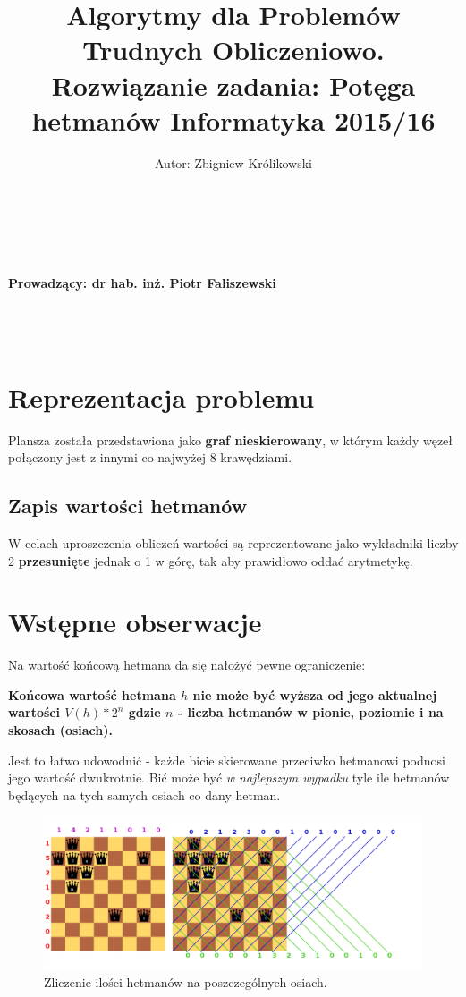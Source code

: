 \documentclass{article}
\author{Autor: Zbigniew Królikowski
\\\\\\\\}
\title{ Algorytmy dla Problemów Trudnych Obliczeniowo.\\
Rozwiązanie zadania: \textbf{Potęga hetmanów}
Informatyka 2015/16}
\begin{document}
\maketitle


\vfill

\paragraph{Prowadzący: dr hab. inż. Piotr Faliszewski
\\\\\\\\
}

\newpage

\tableofcontents

\newpage

\section{Reprezentacja problemu}

Plansza została przedstawiona jako \textbf{graf nieskierowany}, w którym każdy węzeł połączony jest z innymi co najwyżej 8 krawędziami.

\subsection{Zapis wartości hetmanów}

W celach uproszczenia obliczeń wartości są reprezentowane jako wykładniki liczby 2 \textbf{przesunięte} jednak o 1 w górę, tak aby prawidłowo oddać arytmetykę.

\section{Wstępne obserwacje}

Na wartość końcową hetmana da się nałożyć pewne ograniczenie:

\textbf{Końcowa wartość hetmana $h$ nie może być wyższa od jego aktualnej wartości $V(h) * 2^n$ gdzie $n$ - liczba hetmanów w pionie, poziomie i na skosach (osiach).}

Jest to łatwo udowodnić - każde bicie skierowane przeciwko hetmanowi podnosi jego wartość dwukrotnie. Bić może być \textit{w najlepszym wypadku} tyle ile hetmanów będących na tych samych osiach co dany hetman.

\begin{figure}[!ht]
  \centering
      \includegraphics[scale=0.3]{obs1.png}
  \caption{Zliczenie ilości hetmanów na poszczególnych osiach.}
\end{figure}
\end{document}
